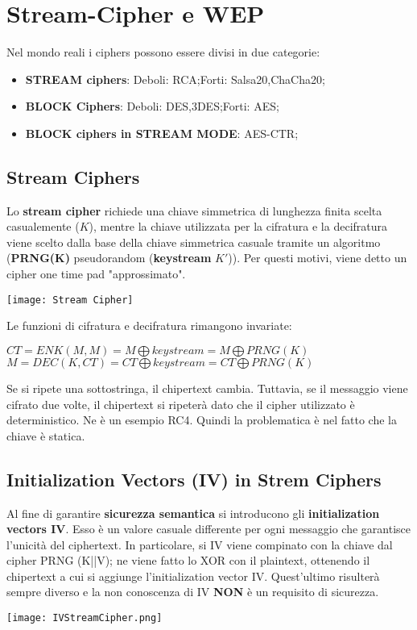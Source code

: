 \documentclass{article}
\theoremstyle{remark}
\begin{document}
\section{Stream-Cipher e WEP}
Nel mondo reali i ciphers possono essere divisi in due categorie:\begin{itemize}
	\item \textbf{STREAM ciphers}: \newline Deboli: RCA;\newline Forti: Salsa20,ChaCha20;
	\item \textbf{BLOCK Ciphers}: \newline Deboli: DES,3DES;\newline Forti: AES\@;
	\item \textbf{BLOCK ciphers in STREAM MODE}: \newline AES-CTR\@;
\end{itemize}
\subsection{Stream Ciphers}
Lo \textbf{stream cipher} richiede una chiave simmetrica di lunghezza finita scelta casualemente (\(K\)), mentre la chiave utilizzata per la cifratura e la decifratura viene scelto dalla base della chiave simmetrica casuale tramite un algoritmo (\textbf{PRNG(K)} pseudorandom (\textbf{keystream} $K'$)). Per questi motivi, viene detto un cipher one time pad "approssimato".
\begin{center}
	\texttt{[image: Stream Cipher]}
\end{center}
Le funzioni di cifratura e decifratura rimangono invariate:
\begin{center}
	\(CT= ENK(M,M)=M \bigoplus keystream = M \bigoplus PRNG(K)\)
	\(M = DEC(K,CT) = CT \bigoplus keystream = CT \bigoplus PRNG(K)\)
\end{center}
Se si ripete una sottostringa, il chipertext cambia. Tuttavia, se il messaggio viene cifrato due volte, il chipertext si ripeterà dato che il cipher utilizzato è deterministico. Ne è un esempio RC4.\newline
Quindi la problematica è nel fatto che la chiave è statica.
\subsection{Initialization Vectors (IV) in Strem Ciphers}
Al fine di garantire \textbf{sicurezza semantica} si introducono gli \textbf{initialization vectors IV}. Esso è un valore casuale differente per ogni messaggio che garantisce l'unicità del ciphertext.
In particolare, si IV viene compinato con la chiave dal cipher PRNG (K||V); ne viene fatto lo XOR con il plaintext, ottenendo il chipertext a cui si aggiunge l'initialization vector IV. Quest'ultimo risulterà sempre diverso e la non conoscenza di IV \textbf{NON} è un requisito di sicurezza.
\begin{center}
	\texttt{[image: IVStreamCipher.png]}
\end{center}
\end{document}
